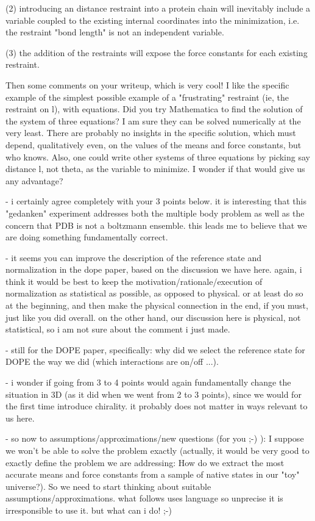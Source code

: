 \begin{itemize}
(2) introducing an distance restraint into a protein chain will
inevitably include a variable coupled to the existing internal
coordinates into the minimization, i.e. the restraint "bond length" is
not an independent variable.

(3) the addition of the restraints will expose the force constants for
each existing restraint.

Then some comments on your writeup, which is very cool! I like the specific example of the simplest possible example of a "frustrating" restraint (ie, the restraint on l), with equations. Did you try Mathematica to find the solution of the system of three equations? I am sure they can be solved numerically at the very least. There are probably no insights in the specific solution, which must depend, qualitatively even,  on the values of the means and force constants, but who knows. Also, one could write other systems of three equations by picking say distance l, not theta, as the variable to minimize. I wonder if that would give us any advantage?

- i certainly agree completely with your 3 points below. it is interesting that this "gedanken" experiment addresses both the multiple body problem as well as the concern that PDB is not a boltzmann ensemble. this leads me to believe that we are doing something fundamentally correct.

- it seems you can improve the description of the reference state and normalization in the dope paper, based on the discussion we have here. again, i think it would be best to keep the motivation/rationale/execution of normalization as statistical as possible, as opposed to physical. or at least do so at the beginning, and then make the physical connection in the end, if you must, just like you did overall. on the other hand, our discussion here is physical, not statistical, so i am not sure about the comment i just made.

- still for the DOPE paper, specifically: why did we select the reference state for DOPE the way we did (which interactions are on/off ...).

- i wonder if going from 3 to 4 points would again fundamentally change the situation in 3D (as it did when we went from 2 to 3 points), since we would for the first time introduce chirality. it probably does not matter in ways relevant to us here.

- so now to assumptions/approximations/new questions (for you ;-) ): I suppose we won't be able to solve the problem exactly (actually, it would be very good to exactly define the problem we are addressing: How do we extract the most accurate means and force constants from a sample of native states in our "toy" universe?). So we need to start thinking about suitable assumptions/approximations. what follows uses language so unprecise it is irresponsible to use it. but what can i do! ;-) 


\end{itemize}

